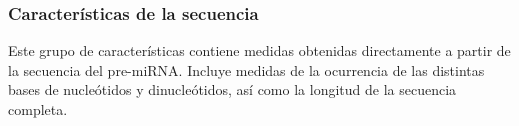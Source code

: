 %
%
\subsubsection{Características de la secuencia}
%
Este grupo de características contiene medidas obtenidas directamente
a partir de la secuencia del pre-miRNA.  Incluye medidas de la
ocurrencia de las distintas bases de nucleótidos y dinucleótidos, así
como la longitud de la secuencia completa.
